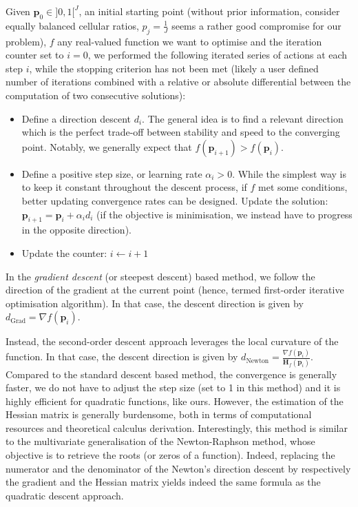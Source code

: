 \documentclass[long, final]{jobim}
\begin{document}
\begin{definition}
\label{def:iterative-optimisation}
    Given $\boldsymbol{p}_0\in ]0, 1[^J$, an initial starting point (without prior information, consider equally balanced cellular ratios, $p_j=\frac{1}{J}$ seems a rather good compromise for our problem), $f$ any real-valued function we want to optimise and the iteration counter set to $i=0$, we performed the following iterated series of actions at each step $i$, while the stopping criterion has not been met (likely a user defined number of iterations combined with a relative or absolute differential between the computation of two consecutive solutions):
        \begin{itemize}
    \item Define a direction descent $d_i$. The general idea is to find a relevant direction which is the perfect trade-off between stability and speed to the converging point. Notably, we generally expect that $f(\boldsymbol{p}_{i+1}) > f(\boldsymbol{p}_{i})$.
    
    \item Define a positive step size, or learning rate $\alpha_i > 0$. While the simplest way is to keep it constant throughout the descent process, if $f$ met some conditions, better updating convergence rates can be designed.  Update the solution: $\boldsymbol{p}_{i+1}=\boldsymbol{p}_i + \alpha_i d_i$ (if the objective is minimisation, we instead have to progress in the opposite direction).
    
    \item Update the counter: $i \leftarrow i + 1$
    
\end{itemize}
    
\end{definition}

In the \textit{gradient descent} (or steepest descent) based method, we follow the direction of the gradient at the current point (hence, termed first-order iterative optimisation algorithm). In that case, the descent direction is given by $d_{\text{Grad}}=\nabla f(\boldsymbol{p}_i)$.

Instead, the second-order descent approach leverages the local curvature of the function. In that case, the descent direction is given by $d_{\text{Newton}}= \frac{\nabla f(\boldsymbol{p}_i)}{\mathbf{H}_f(\boldsymbol{p}_i)}$. Compared to the standard descent based method, the convergence is generally faster, we do not have to adjust the step size (set to 1 in this method) and it is highly efficient for quadratic functions, like ours. However, the estimation of the Hessian matrix is generally burdensome, both in terms of computational resources and theoretical calculus derivation. Interestingly, this method is similar to the multivariate generalisation of the Newton-Raphson method, whose objective is to retrieve the roots (or zeros of a function). Indeed, replacing the numerator and the denominator of the Newton's direction descent by respectively the gradient and the Hessian matrix yields indeed the same formula as the quadratic descent approach. 
\end{document}
